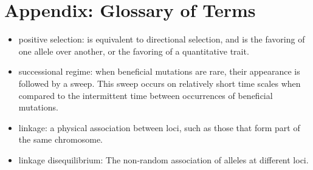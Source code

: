 \documentclass[12pt,twocolumn]{article}
\begin{document}
\section{Appendix: Glossary of Terms}
\begin{itemize}
\item positive selection: is equivalent to directional selection, and is the favoring of one allele over another, or the favoring of a quantitative trait.
\item successional regime: when beneficial mutations are rare, their appearance is followed by a sweep.  This sweep occurs on relatively short time scales when compared to the intermittent time between occurrences of beneficial mutations.
\item linkage: a physical association between loci, such as those that form part of the same chromosome.
\item linkage disequilibrium:  The non-random association of alleles at different loci.
\end{itemize}



\end{document}
